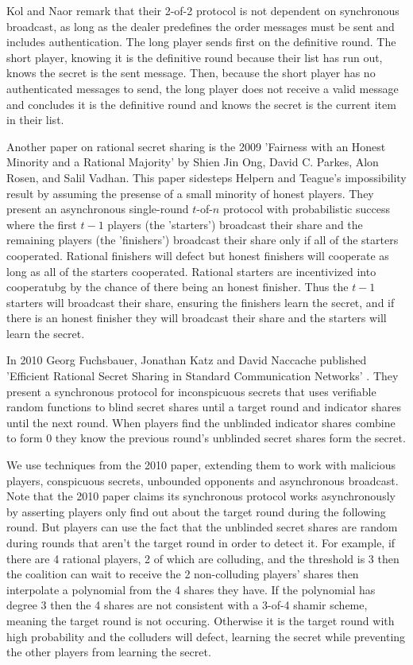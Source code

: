 \documentclass{dalcsthesis}
\begin{document}
Kol and Naor remark that their 2-of-2 protocol is not dependent on synchronous broadcast, as long as the dealer predefines the order messages must be sent and includes authentication. The long player sends first on the definitive round. The short player, knowing it is the definitive round because their list has run out, knows the secret is the sent message. Then, because the short player has no authenticated messages to send, the long player does not receive a valid message and concludes it is the definitive round and knows the secret is the current item in their list.

Another paper on rational secret sharing is the 2009 'Fairness with an Honest Minority and a Rational Majority' \cite{ong09} by Shien Jin Ong, David C. Parkes, Alon Rosen, and Salil Vadhan. This paper sidesteps Helpern and Teague's impossibility result by assuming the presense of a small minority of honest players. They present an asynchronous single-round $t$-of-$n$ protocol with probabilistic success where the first $t-1$ players (the 'starters') broadcast their share and the remaining players (the 'finishers') broadcast their share only if all of the starters cooperated. Rational finishers will defect but honest finishers will cooperate as long as all of the starters cooperated. Rational starters are incentivized into cooperatubg by the chance of there being an honest finisher. Thus the $t-1$ starters will broadcast their share, ensuring the finishers learn the secret, and if there is an honest finisher they will broadcast their share and the starters will learn the secret.

In 2010 Georg Fuchsbauer, Jonathan Katz and David Naccache published 'Efficient Rational Secret Sharing in Standard Communication Networks' \cite{fuch10}. They present a synchronous protocol for inconspicuous secrets that uses verifiable random functions to blind secret shares until a target round and indicator shares until the next round. When players find the unblinded indicator shares combine to form 0 they know the previous round's unblinded secret shares form the secret.

We use techniques from the 2010 paper, extending them to work with malicious players, conspicuous secrets, unbounded opponents and asynchronous broadcast. Note that the 2010 paper claims its synchronous protocol works asynchronously by asserting players only find out about the target round during the following round. But players can use the fact that the unblinded secret shares are random during rounds that aren't the target round in order to detect it. For example, if there are 4 rational players, 2 of which are colluding, and the threshold is 3 then the coalition can wait to receive the 2 non-colluding players' shares then interpolate a polynomial from the 4 shares they have. If the polynomial has degree 3 then the 4 shares are not consistent with a 3-of-4 shamir scheme, meaning the target round is not occuring. Otherwise it is the target round with high probability and the colluders will defect, learning the secret while preventing the other players from learning the secret.
\end{document}
